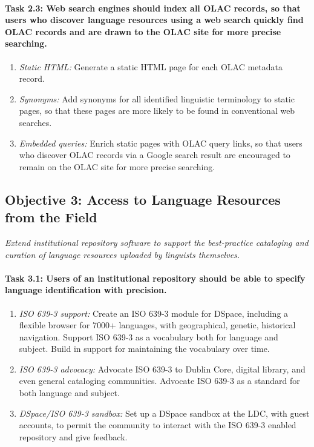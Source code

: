 \def\task{2.3}
\paragraph{Task {\task}: Web search engines should index all OLAC records,
      so that users who discover language resources using a web search
      quickly find OLAC records and are drawn to the OLAC site for
      more precise searching.}

\begin{enumerate}[label=\emph{\task\alph*}]
\item \emph{Static HTML:}
  Generate a static HTML page for each OLAC metadata record.
\item \emph{Synonyms:}
  Add synonyms for all identified linguistic terminology to static pages,
  so that these pages are more likely to be found in
  conventional web searches.
\item \emph{Embedded queries:}
  Enrich static pages with OLAC query links, so that users who discover
  OLAC records via a Google search result are encouraged to remain on the
  OLAC site for more precise searching.
\end{enumerate}

\subsection*{Objective 3: Access to Language Resources from the Field}

\emph{Extend institutional repository software to support the best-practice
    cataloging and curation of language resources 
    uploaded by linguists themselves.}

\def\task{3.1}
\paragraph{Task {\task}: Users of an institutional repository should be able
  to specify language identification with precision.}

\begin{enumerate}[label=\emph{\task\alph*}]
\item \emph{ISO 639-3 support:}
  Create an ISO 639-3 module for DSpace, including a flexible
  browser for 7000+ languages, with geographical, genetic, historical
  navigation. Support ISO 639-3 as a vocabulary both for language and subject.
  Build in support for maintaining the vocabulary over time.
\item \emph{ISO 639-3 advocacy:}
  Advocate ISO 639-3 to Dublin Core, digital library, and even general cataloging
  communities. Advocate ISO 639-3 as a standard for both language and subject.
\item \emph{DSpace/ISO 639-3 sandbox:}
  Set up a DSpace sandbox at the LDC, with guest accounts,
  to permit the community to interact with the
  ISO 639-3 enabled repository and give feedback.
\end{enumerate}

